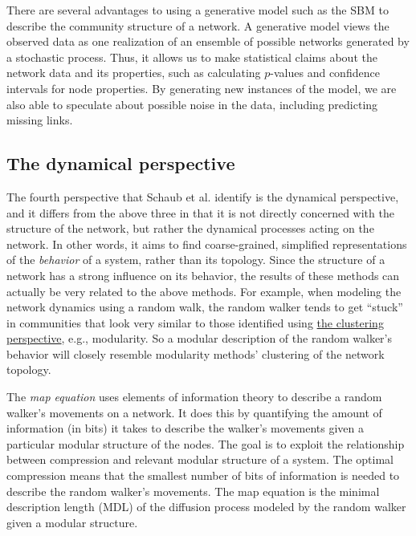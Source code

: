 There are several advantages to using a generative model such as the SBM
to describe the community structure of a network. A generative model
views the observed data as one realization of an ensemble of possible
networks generated by a stochastic process. Thus, it allows us to make
statistical claims about the network data and its properties, such as
calculating \(p\)-values and confidence intervals for node properties.
By generating new instances of the model, we are also able to speculate
about possible noise in the data, including predicting missing links.


\hypertarget{the-dynamical-perspective}{\subsection{The dynamical
perspective}\label{the-dynamical-perspective}}

The fourth perspective that Schaub et al. identify is the dynamical
perspective, and it differs from the above three in that it is not
directly concerned with the structure of the network, but rather the
dynamical processes acting on the network. In other words, it aims to
find coarse-grained, simplified representations of the \emph{behavior}
of a system, rather than its topology. Since the structure of a network
has a strong influence on its behavior, the results of these methods can
actually be very related to the above methods. For example, when
modeling the network dynamics using a random walk, the random walker
tends to get ``stuck'' in communities that look very similar to those
identified using \protect\hyperlink{clustering-perspective}{the
clustering perspective}, e.g., modularity. So a modular description of
the random walker's behavior will closely resemble modularity methods'
clustering of the network topology.

The \emph{map equation} uses elements of information theory to describe
a random walker's movements on a network. It does this by quantifying
the amount of information (in bits) it takes to describe the walker's
movements given a particular modular structure of the nodes. The goal is
to exploit the relationship between compression and relevant modular
structure of a system. The optimal compression means that the smallest
number of bits of information is needed to describe the random walker's
movements. The map equation is the minimal description length (MDL) of
the diffusion process modeled by the random walker given a modular
structure.

